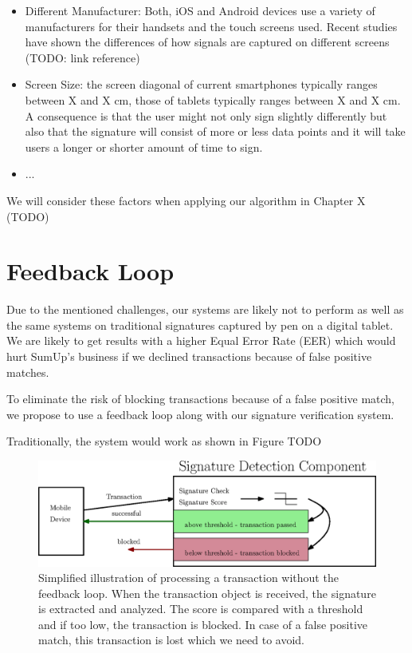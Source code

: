\documentclass[a4paper, oneside]{csthesis}
\begin{document}
\begin{itemize}
\item Different Manufacturer: Both, iOS and Android devices use a variety of manufacturers for their handsets and the touch screens used. Recent studies have shown the differences of how signals are captured on different screens (TODO: link reference)
\item Screen Size: the screen diagonal of current smartphones typically ranges between X and X cm, those of tablets typically ranges between X and X cm. A consequence is that the user might not only sign slightly differently but also that the signature will consist of more or less data points and it will take users a longer or shorter amount of time to sign.
\item  ...
\end{itemize}


We will consider these factors when applying our algorithm in Chapter X (TODO)






\section{Feedback Loop}

Due to the mentioned challenges, our systems are likely not to perform as well as the same systems on traditional signatures captured by pen on a digital tablet. We are likely to get results with a higher Equal Error Rate (EER) which would hurt SumUp's business if we declined transactions because of false positive matches.

To eliminate the risk of blocking transactions because of a false positive match, we propose to use a feedback loop along with our signature verification system.

Traditionally, the system would work as shown in Figure TODO


\begin{figure}[tb]
    \begin{center}
        \includegraphics[width=1\textwidth]{figures/fb-loop1.eps}
    \end{center}
    \caption{Simplified illustration of processing a transaction without the feedback loop. When the transaction object is received, the signature is extracted and analyzed. The score is compared with a threshold and if too low, the transaction is blocked. In case of a false positive match, this transaction is lost which we need to avoid.}
    \label{fig:fb-loop1}
\end{figure}
\end{document}
